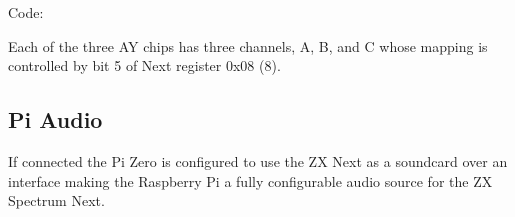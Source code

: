 Code:


Each of the three AY chips has three channels, A, B, and C whose
mapping is controlled by bit 5 of Next register 0x08 (8).
















\subsection{Pi Audio}
If connected the Pi Zero is configured to use the ZX Next as a
soundcard over an \iis interface making the Raspberry Pi a fully
configurable audio source for the ZX Spectrum Next.
